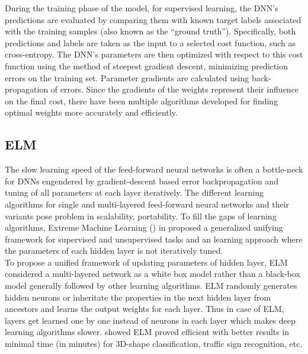 \documentclass[a4paper]{article}
\begin{document}
During the training phase of the model, for supervised learning, the DNN’s predictions are evaluated by comparing them with known target labels associated with the training samples (also known as the “ground truth”). Specifically, both predictions and labels are taken as the input to a selected cost function, such as cross-entropy. The DNN’s parameters are then optimized with respect to this cost function using the method of steepest gradient descent, minimizing prediction errors on the training set. Parameter gradients are calculated using back-propagation of errors. Since the gradients of the weights represent their influence on the final cost, there have been multiple algorithms developed for finding optimal weights more accurately and efficiently. 

\subsection*{ELM}
The slow learning speed of the feed-forward neural networks is often a bottle-neck for DNNs engendered by gradient-descent based error backpropagation and tuning of all parameters at each layer iteratively. The different learning algorithms for single and multi-layered feed-forward neural networks and their variants pose problem in scalability, portability. To fill the gaps of learning algorithms, Extreme Machine Learning () in \cite{huang2006extreme} proposed a generalized unifying framework for supervised and unsupervised tasks and an learning approach where the parameters of each hidden layer is not iteratively tuned.\\
To propose a unified framework of updating parameters of hidden layer, ELM considered a multi-layered network as a white box model rather than a black-box model generally followed by other learning algorithms. ELM randomly generates hidden neurons or inheritate the properties in the next hidden layer from ancestors and learns the output weights for each layer. Thus in case of ELM, layers get learned one by one instead of neurons in each layer which makes deep learning algorithms slower. \cite{huang2006extreme} showed ELM proved efficient with better results in minimal time (in minutes) for 3D-shape classification, traffic sign recognition, etc.
\end{document}
